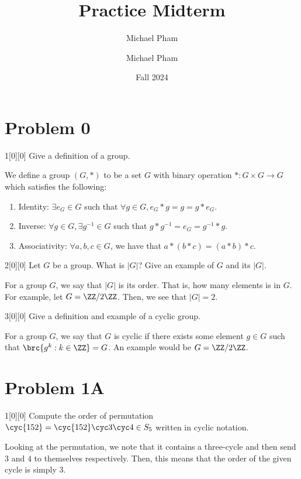 \documentclass{article}
\title{#1}
\author{Michael Pham}
\date{#2}
\renewcommand{\mytitle}[2]{%
	\title{#1}
	\author{Michael Pham}
	\date{#2}
	\maketitle
	\newpage
	\listoftheorems
	\newpage
}
\begin{document}
\mytitle{Practice Midterm}{Fall 2024}

\addtocounter{section}{-1}
\section{Problem 0}
\begin{hw}{1}[0][0]
	Give a definition of a group.
\end{hw}
\begin{solution}
	We define a group $(G, *)$ to be a set $G$ with binary operation $*: G \times G \rightarrow G$ which satisfies the following:
	\begin{enumerate}
		\item Identity: $\exists e_G \in G$ such that $\forall g \in G, e_G * g = g = g * e_G$.
		\item Inverse: $\forall g \in G, \exists g^{-1} \in G$ such that $g*g^{-1} = e_G = g^{-1}*g$.
		\item Associativity: $\forall a,b,c \in G$, we have that $a*(b*c) = (a*b)*c$.
	\end{enumerate}
\end{solution}

\begin{hw}{2}[0][0]
	Let $G$ be a group. What is $\lvert G \rvert$? Give an example of $G$ and its $\lvert G \rvert$.
\end{hw}
\begin{solution}
	For a group $G$, we say that $\lvert G \rvert$ is its order. That is, how many elements is in $G$. For example, let $G = \ZZ/2\ZZ$. Then, we see that $\lvert G \rvert = 2$.
\end{solution}

\begin{hw}{3}[0][0]
	Give a definition and example of a cyclic group.
\end{hw}
\begin{solution}
	For a group $G$, we say that $G$ is cyclic if there exists some element $g \in G$ such that $\brc{g^{k} : k \in \ZZ} = G$. An example would be $G = \ZZ/2\ZZ$.
\end{solution}

\section{Problem 1A}
\begin{hw}{1}[0][0]
	Compute the order of permutation $\cyc{1 5 2} = \cyc{1 5 2}\cyc 3\cyc 4 \in S_5$ written in cyclic notation.
\end{hw}
\begin{solution}
	Looking at the permutation, we note that it contains a three-cycle and then send $3$ and $4$ to themselves respectively. Then, this means that the order of the given cycle is simply 3.
\end{solution}
\end{document}
